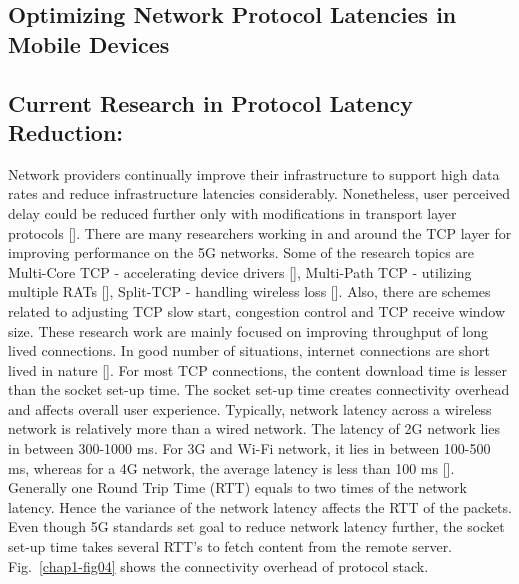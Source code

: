 \begin{multicols}{2}

\subsection{Optimizing Network Protocol Latencies in Mobile Devices}

\subsection{Current Research in Protocol Latency Reduction:}

Network providers continually improve their infrastructure to support high data rates and reduce infrastructure latencies considerably. Nonetheless, user perceived delay could be reduced further only with modifications in transport layer protocols [\cite{art1-key07}]. There are many researchers working in and around the TCP layer for improving performance on the 5G networks. Some of the research topics are Multi-Core TCP - accelerating device drivers [\cite{art1-key08}], Multi-Path TCP - utilizing multiple RATs [\cite{art1-key09}], Split-TCP - handling wireless loss [\cite{art1-key10}]. Also, there are schemes related to adjusting TCP slow start, congestion control and TCP receive window size. These research work are mainly focused on improving throughput of long lived connections. In good number of situations, internet connections are short lived in nature [\cite{art1-key11}]. For most TCP connections, the content download time is lesser than the socket set-up time. The socket set-up time creates connectivity overhead and affects overall user experience. Typically, network latency across a wireless network is relatively more than a wired network. The latency of 2G network lies in between 300-1000 ms. For 3G and Wi-Fi network, it lies in between 100-500 ms, whereas for a 4G network, the average latency is less than 100 ms [\cite{art1-key12}]. Generally one Round Trip Time (RTT) equals to two times of the network latency. Hence the variance of the network latency affects the RTT of the packets. Even though 5G standards set goal to reduce network latency further, the socket set-up time takes several RTT’s to fetch content from the remote server. Fig.~\ref{chap1-fig04} shows the connectivity overhead of protocol stack.



\end{multicols}
